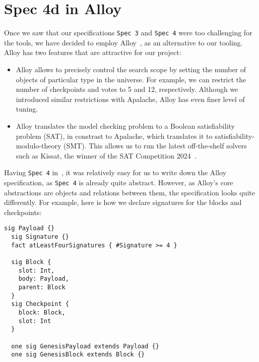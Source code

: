 
\section{Spec 4d in Alloy}

Once we saw that our specifications \texttt{Spec 3} and \texttt{Spec 4}
were too challenging for the \tlap{} tools, we have decided to employ
Alloy~\cite{jackson2012software,alloytools}, as an alternative to our tooling.
Alloy has two features that are attractive for our project:

\begin{itemize}

  \item Alloy allows to precisely control the search scope by setting the
      number of objects of particular type in the universe. For example, we can
      restrict the number of checkpoints and votes to 5 and 12, respectively.
      Although we introduced similar restrictions with Apalache, Alloy has even
      finer level of tuning.

  \item Alloy translates the model checking problem to a Boolean satisfiability
      problem (SAT), in constrast to Apalache, which translates it to satisfiability-modulo-theory (SMT).  This
      allows us to run the latest off-the-shelf solvers such as Kissat, the
      winner of the SAT Competition 2024~\cite{SAT-Competition-2024-solvers}.

\end{itemize}

Having \texttt{Spec 4} in~\tlap{}, it was relatively easy for us to write down
the Alloy specification, as \texttt{Spec 4} is already quite abstract. However, as
Alloy's core abstractions are objects and relations between them, the
specification looks quite differently. For example, here is how we declare
signatures for the blocks and checkpoints:

\begin{lstlisting}[language=alloy,columns=fullflexible]
  sig Payload {}
  sig Signature {}
  fact atLeastFourSignatures { #Signature >= 4 }

  sig Block {
    slot: Int,
    body: Payload,
    parent: Block
  }
  sig Checkpoint {
    block: Block,
    slot: Int
  }

  one sig GenesisPayload extends Payload {}
  one sig GenesisBlock extends Block {}
\end{lstlisting}


